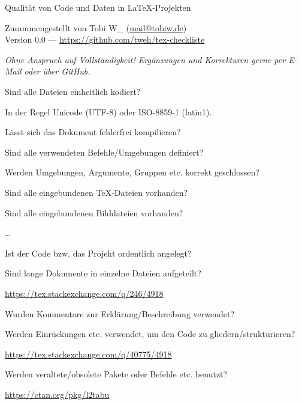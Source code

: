 \documentclass[
   ngerman,
   fontsize = 11.5pt,
   parskip = half,
   headings = small,
]{scrartcl}
\let\section\minisec
\newcommand{\hint}[1]{{%
   \par
   \vspace{-\parskip}%
   \footnotesize
   #1
}}
\begin{document}
\RaggedRight

\begin{center}
   \setlength{\parskip}{0pt}
   \bfseries
   
   \smallskip
   \LARGE\color{spot}
   Qualität von Code und Daten in \LaTeX-Projekten
   
   \vspace{\baselineskip}
   \normalsize\mdseries\normalcolor
   Zusammengestellt von Tobi W\_ (\url{mail@tobiw.de})\\
   Version 0.0 --- \url{https://github.com/tweh/tex-checkliste}\\
\end{center}

\vspace{\baselineskip}
{\footnotesize\itshape
   Ohne Anspruch auf Vollständigkeit! Ergänzungen und Korrekturen gerne per
   E-Mail oder über GitHub.
\par}

\vspace{2\baselineskip}
\section{Allgemeines}
\begin{checklist}
   \item Sind alle Dateien einheitlich kodiert?
      \hint{In der Regel Unicode (UTF-8) oder ISO-8859-1 (latin1).}
   \item Lässt sich das Dokument fehlerfrei kompilieren?
   \begin{checklist}
      \item Sind alle verwendeten Befehle/Umgebungen definiert?
      \item Werden Umgebungen, Argumente, Gruppen etc. korrekt geschlossen?
      \item Sind alle eingebundenen \TeX-Dateien vorhanden?
      \item Sind alle eingebundenen Bilddateien vorhanden?
      \item \dots
   \end{checklist}
   \item Ist der Code bzw. das Projekt ordentlich angelegt?
   \begin{checklist}
      \item Sind lange Dokumente in einzelne Dateien aufgeteilt?
         \hint{\url{https://tex.stackexchange.com/q/246/4918}}
      \item Wurden Kommentare zur Erklärung/Beschreibung verwendet?
      \item Werden Einrückungen etc. verwendet, um den Code zu gliedern/strukturieren?
         \hint{\url{https://tex.stackexchange.com/q/40775/4918}}
   \end{checklist}
   \item Werden veraltete/obsolete Pakete oder Befehle etc. benutzt?
      \hint{\url{https://ctan.org/pkg/l2tabu}}
\end{checklist}
\end{document}
